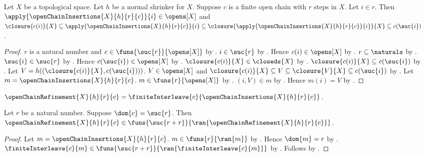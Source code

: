 \begin{proposition}\label{open_chain_insertions_apply}
    Let $X$ be a topological space.
    Let $h$ be a normal shrinker for $X$.
    Suppose $c$ is a finite open chain with $r$ steps in $X$.
    Let $i\in r$.
    Then $\apply{\openChainInsertions{X}{h}{r}{c}}{i}\in\opens[X]$ and
        $\closure{c(i)}{X}
            \subseteq\apply{\openChainInsertions{X}{h}{r}{c}}{i}
            \subseteq\closure{\apply{\openChainInsertions{X}{h}{r}{c}}{i}}{X}
            \subseteq c(\suc{i})$.
\end{proposition}
\begin{proof}
    $r$ is a natural number and
        $c\in\funs{\suc{r}}{\opens[X]}$
        by .
    $i\in\suc{r}$ by .
    Hence $c(i)\in\opens[X]$ by .
    $r\subseteq\naturals$
        by .
    $\suc{i}\in\suc{r}$
        by .
    Hence $c(\suc{i})\in\opens[X]$ by .
    $\closure{c(i)}{X}\in\closeds{X}$
        by .
    $\closure{c(i)}{X}\subseteq c(\suc{i})$
        by .
    Let $V=h((\closure{c(i)}{X},c(\suc{i})))$.
    $V\in\opens[X]$ and
        $\closure{c(i)}{X}\subseteq V\subseteq\closure{V}{X}
            \subseteq c(\suc{i})$
        by .
    Let $m=\openChainInsertions{X}{h}{r}{c}$.
    $m\in\funs{r}{\opens[X]}$
        by .
    $(i,V)\in m$ by .
    Hence $m(i)=V$ by .
\end{proof}

\begin{definition}\label{open_chain_refinement}
    $\openChainRefinement{X}{h}{r}{c}=
        \finiteInterleave{c}{\openChainInsertions{X}{h}{r}{c}}$.
\end{definition}

\begin{proposition}\label{open_chain_refinement_function}
    Let $r$ be a natural number.
    Suppose $\dom{c}=\suc{r}$.
    Then $\openChainRefinement{X}{h}{r}{c}\in
        \funs{\suc{r+r}}{\ran{\openChainRefinement{X}{h}{r}{c}}}$.
\end{proposition}
\begin{proof}
    Let $m=\openChainInsertions{X}{h}{r}{c}$.
    $m\in\funs{r}{\ran{m}}$ by .
    Hence $\dom{m}=r$ by .
    $\finiteInterleave{c}{m}\in
        \funs{\suc{r+r}}{\ran{\finiteInterleave{c}{m}}}$
        by .
    Follows by .
\end{proof}

